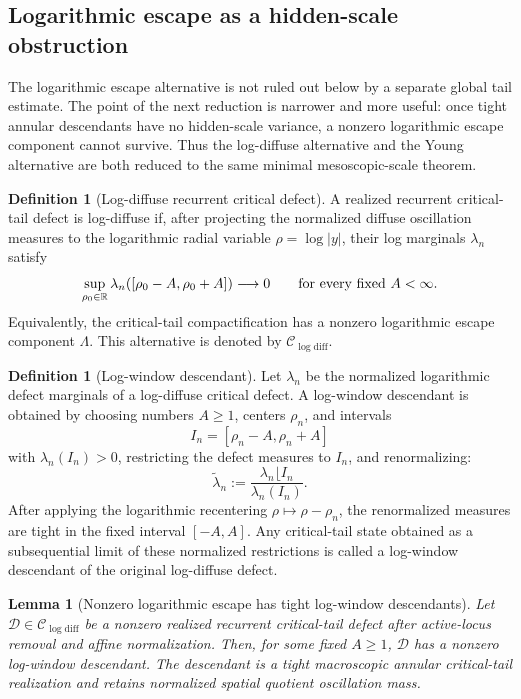 \documentclass[11pt]{amsart}
\numberwithin{equation}{section}
\theoremstyle{plain}
\newtheorem{lemma}[theorem]{Lemma}
\theoremstyle{definition}
\newtheorem{definition}[theorem]{Definition}
\theoremstyle{remark}
\newcommand{\Clogdiff}{\mathcal C_{\log\mathrm{diff}}}
\begin{document}
\subsection{Logarithmic escape as a hidden-scale obstruction}
\label{subsec:logarithmic-escape-hidden-scale}

The logarithmic escape alternative is not ruled out below by a separate global
tail estimate.  The point of the next reduction is narrower and more useful:
once tight annular descendants have no hidden-scale variance, a nonzero
logarithmic escape component cannot survive.  Thus the log-diffuse alternative and
the Young alternative are both reduced to the same minimal mesoscopic-scale
theorem.

\begin{definition}[Log-diffuse recurrent critical defect]
\label{def:log-diffuse-recurrent-critical-defect}
A realized recurrent critical-tail defect is log-diffuse if, after projecting
the normalized diffuse oscillation measures to the logarithmic radial variable
\(\rho=\log |y|\), their log marginals \(\lambda_n\) satisfy
\[
   \sup_{\rho_0\in\mathbb R}
   \lambda_n([\rho_0-A,\rho_0+A])\longrightarrow0
   \qquad\hbox{for every fixed }A<\infty .
\]
Equivalently, the critical-tail compactification has a nonzero logarithmic
escape component \(\Lambda\).  This alternative is denoted by \(\Clogdiff\).
\end{definition}

\begin{definition}[Log-window descendant]
\label{def:log-window-descendant}
Let \(\lambda_n\) be the normalized logarithmic defect marginals of a
log-diffuse critical defect.  A log-window descendant is obtained by choosing
numbers \(A\ge1\), centers \(\rho_n\), and intervals
\[
   I_n=[\rho_n-A,\rho_n+A]
\]
with \(\lambda_n(I_n)>0\), restricting the defect measures to \(I_n\), and
renormalizing:
\[
   \widetilde\lambda_n
   :=
   \frac{\lambda_n\lfloor I_n}{\lambda_n(I_n)} .
\]
After applying the logarithmic recentering \(\rho\mapsto\rho-\rho_n\), the
renormalized measures are tight in the fixed interval \([-A,A]\).  Any
critical-tail state obtained as a subsequential limit of these normalized
restrictions is called a log-window descendant of the original log-diffuse
defect.
\end{definition}

\begin{lemma}[Nonzero logarithmic escape has tight log-window descendants]
\label{lem:log-window-descendant-selection}
Let \(\mathcal D\in\Clogdiff\) be a nonzero realized recurrent critical-tail
defect after active-locus removal and affine normalization.  Then, for some
fixed \(A\ge1\), \(\mathcal D\) has a nonzero log-window descendant.  The
descendant is a tight macroscopic annular critical-tail realization and
retains normalized spatial quotient oscillation mass.
\end{lemma}
\end{document}

